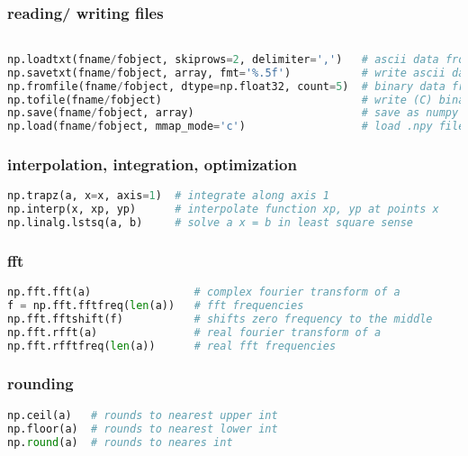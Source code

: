 \documentclass[]{article}
\begin{document}
\subsubsection{reading/ writing files}\label{reading-writing-files}

\begin{lstlisting}[language=Python]

np.loadtxt(fname/fobject, skiprows=2, delimiter=',')   # ascii data from file
np.savetxt(fname/fobject, array, fmt='%.5f')           # write ascii data
np.fromfile(fname/fobject, dtype=np.float32, count=5)  # binary data from file
np.tofile(fname/fobject)                               # write (C) binary data
np.save(fname/fobject, array)                          # save as numpy binary (.npy)
np.load(fname/fobject, mmap_mode='c')                  # load .npy file (memory mapped)
\end{lstlisting}

\subsubsection{interpolation, integration,
optimization}\label{interpolation-integration-optimization}

\begin{lstlisting}[language=Python]
np.trapz(a, x=x, axis=1)  # integrate along axis 1
np.interp(x, xp, yp)      # interpolate function xp, yp at points x
np.linalg.lstsq(a, b)     # solve a x = b in least square sense
\end{lstlisting}

\subsubsection{fft}\label{fft}

\begin{lstlisting}[language=Python]
np.fft.fft(a)                # complex fourier transform of a
f = np.fft.fftfreq(len(a))   # fft frequencies
np.fft.fftshift(f)           # shifts zero frequency to the middle
np.fft.rfft(a)               # real fourier transform of a
np.fft.rfftfreq(len(a))      # real fft frequencies
\end{lstlisting}

\subsubsection{rounding}\label{rounding}

\begin{lstlisting}[language=Python]
np.ceil(a)   # rounds to nearest upper int
np.floor(a)  # rounds to nearest lower int
np.round(a)  # rounds to neares int
\end{lstlisting}
\end{document}

